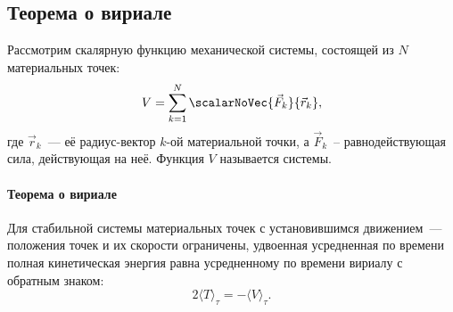 \subsection{Теорема о вириале}
\label{sec:virial}
Рассмотрим скалярную функцию механической системы, состоящей из $N$ материальных точек:
\begin{equation}
    V = \sum_{k=1}^N \scalarNoVec{\vec F_k}{\vec r_k},
    \label{eq:virial-def}
\end{equation}
где $\vec r_k$~--- её радиус-вектор $k$-ой материальной точки, а $\vec F_k$~-- равнодействующая сила, действующая на неё. Функция $V$ называется  системы.

\paragraph{Теорема о вириале} Для стабильной системы материальных точек с установившимся движением~--- положения точек и их скорости ограничены, удвоенная усредненная по времени полная кинетическая энергия равна усредненному по времени вириалу с обратным знаком:
\begin{equation}
    2 \langle T \rangle_\tau = - \langle V \rangle_\tau.
\end{equation}

